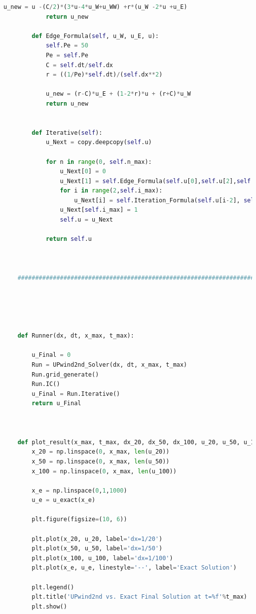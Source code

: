 \documentclass[12pt]{article}
\begin{document}
\begin{scriptsize}
\begin{lstlisting}[language=python,caption={Problem2, 2nd UPwind Solver updated}]
            u_new = u -(C/2)*(3*u-4*u_W+u_WW) +r*(u_W -2*u +u_E)
            return u_new
        
        def Edge_Formula(self, u_W, u_E, u):
            self.Pe = 50
            Pe = self.Pe
            C = self.dt/self.dx
            r = ((1/Pe)*self.dt)/(self.dx**2)
    
            u_new = (r-C)*u_E + (1-2*r)*u + (r+C)*u_W
            return u_new
        
    
        def Iterative(self):
            u_Next = copy.deepcopy(self.u)
    
            for n in range(0, self.n_max):
                u_Next[0] = 0
                u_Next[1] = self.Edge_Formula(self.u[0],self.u[2],self.u[1])
                for i in range(2,self.i_max):
                    u_Next[i] = self.Iteration_Formula(self.u[i-2], self.u[i-1], self.u[i+1], self.u[i])
                u_Next[self.i_max] = 1
                self.u = u_Next
    
            return self.u
        
     
    
    ###############################################################################################
    
    
        
    
    
    def Runner(dx, dt, x_max, t_max):
    
        u_Final = 0
        Run = UPwind2nd_Solver(dx, dt, x_max, t_max)
        Run.grid_generate()
        Run.IC()
        u_Final = Run.Iterative()
        return u_Final
    
    
    
    def plot_result(x_max, t_max, dx_20, dx_50, dx_100, u_20, u_50, u_100):
        x_20 = np.linspace(0, x_max, len(u_20))
        x_50 = np.linspace(0, x_max, len(u_50))
        x_100 = np.linspace(0, x_max, len(u_100))
    
        x_e = np.linspace(0,1,1000)
        u_e = u_exact(x_e)
    
        plt.figure(figsize=(10, 6))
    
        plt.plot(x_20, u_20, label='dx=1/20')
        plt.plot(x_50, u_50, label='dx=1/50')
        plt.plot(x_100, u_100, label='dx=1/100')
        plt.plot(x_e, u_e, linestyle='--', label='Exact Solution')
    
        plt.legend()
        plt.title('UPwind2nd vs. Exact Final Solution at t=%f'%t_max)
        plt.show()
    

\end{lstlisting}
\end{scriptsize}
\end{document}
